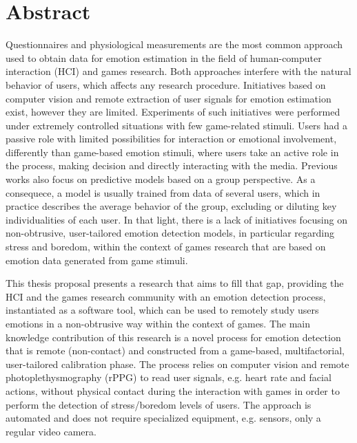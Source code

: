 \chapter*{Abstract}

Questionnaires and physiological measurements are the most common approach used to obtain data for emotion estimation in the field of human-computer interaction (HCI) and games research. Both approaches interfere with the natural behavior of users, which affects any research procedure. Initiatives based on computer vision and remote extraction of user signals for emotion estimation exist, however they are limited. Experiments of such initiatives were performed under extremely controlled situations with few game-related stimuli. Users had a passive role with limited possibilities for interaction or emotional involvement, differently than game-based emotion stimuli, where users take an active role in the process, making decision and directly interacting with the media. Previous works also focus on predictive models based on a group perspective. As a consequece, a model is usually trained from data of several users, which in practice describes the average behavior of the group, excluding or diluting key individualities of each user. In that light, there is a lack of initiatives focusing on non-obtrusive, user-tailored emotion detection models, in particular regarding stress and boredom, within the context of games research that are based on emotion data generated from game stimuli.

This thesis proposal presents a research that aims to fill that gap, providing the HCI and the games research community with an emotion detection process, instantiated as a software tool, which can be used to remotely study users emotions in a non-obtrusive way within the context of games. The main knowledge contribution of this research is a novel process for emotion detection that is remote (non-contact) and constructed from a game-based, multifactorial, user-tailored calibration phase. The process relies on computer vision and remote photoplethysmography (rPPG) to read user signals, e.g. heart rate and facial actions, without physical contact during the interaction with games in order to perform the detection of stress/boredom levels of users. The approach is automated and does not require specialized equipment, e.g. sensors, only a regular video camera.

